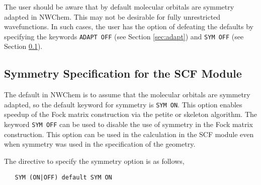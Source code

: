 



The user should be aware that by default molecular orbitals are symmetry 
adapted in NWChem.  This may not be desirable for fully unrestricted 
wavefunctions.  In such cases, the user has the option of defeating the
defaults by specifying the keywords \verb+ADAPT OFF+ (see Section 
\ref{sec:adapt}) and \verb+SYM OFF+ (see Section \ref{sec:sym}).

\subsection{Symmetry Specification for the SCF Module}
\label{sec:sym}

The default in NWChem is to assume that the molecular orbitals are 
symmetry adapted, so the default keyword for symmetry is \verb+SYM ON+.
This option enables speedup of the Fock matrix construction via the
petite or skeleton algorithm.  The keyword \verb+SYM OFF+ can be used to
%
disable the use of symmetry in the Fock matrix construction.  This
option can be used in the calculation in the SCF module even when
symmetry was used in the specification of the geometry.

The directive to specify the symmetry option is as follows,

 \begin{verbatim}
   SYM (ON|OFF) default SYM ON
 \end{verbatim}


